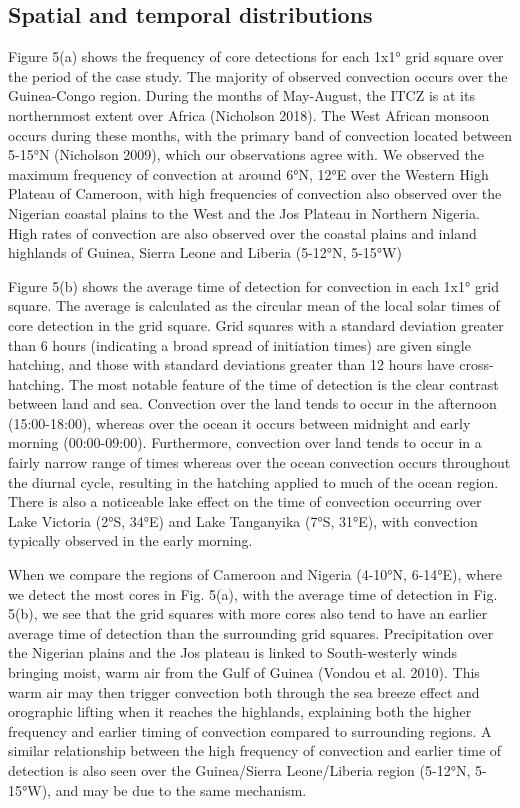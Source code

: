 \subsection{Spatial and temporal distributions}

Figure 5(a) shows the frequency of core detections for each 1x1° grid
square over the period of the case study. The majority of observed
convection occurs over the Guinea-Congo region. During the months of
May-August, the ITCZ is at its northernmost extent over Africa
(Nicholson 2018). The West African monsoon occurs during these
months, with the primary band of convection located between 5-15°N
(Nicholson 2009), which our observations agree with. We observed the
maximum frequency of convection at around 6°N, 12°E over the Western
High Plateau of Cameroon, with high frequencies of convection also
observed over the Nigerian coastal plains to the West and the Jos
Plateau in Northern Nigeria. High rates of convection are also observed
over the coastal plains and inland highlands of Guinea, Sierra Leone and
Liberia (5-12°N, 5-15°W)

Figure 5(b) shows the average time of detection for convection in each
1x1° grid square. The average is calculated as the circular mean of the
local solar times of core detection in the grid square. Grid squares
with a standard deviation greater than 6 hours (indicating a broad
spread of initiation times) are given single hatching, and those with
standard deviations greater than 12 hours have cross-hatching. The most
notable feature of the time of detection is the clear contrast between
land and sea. Convection over the land tends to occur in the afternoon
(15:00-18:00), whereas over the ocean it occurs between midnight and
early morning (00:00-09:00). Furthermore, convection over land tends to
occur in a fairly narrow range of times whereas over the ocean
convection occurs throughout the diurnal cycle, resulting in the
hatching applied to much of the ocean region. There is also a noticeable
lake effect on the time of convection occurring over Lake Victoria (2°S,
34°E) and Lake Tanganyika (7°S, 31°E), with convection typically
observed in the early morning.

When we compare the regions of Cameroon and Nigeria (4-10°N, 6-14°E),
where we detect the most cores in Fig. 5(a), with the average time of
detection in Fig. 5(b), we see that the grid squares with more cores
also tend to have an earlier average time of detection than the
surrounding grid squares. Precipitation over the Nigerian plains and the
Jos plateau is linked to South-westerly winds bringing moist, warm air
from the Gulf of Guinea (Vondou et al. 2010). This warm air may then
trigger convection both through the sea breeze effect and orographic
lifting when it reaches the highlands, explaining both the higher
frequency and earlier timing of convection compared to surrounding
regions. A similar relationship between the high frequency of convection
and earlier time of detection is also seen over the Guinea/Sierra
Leone/Liberia region (5-12°N, 5-15°W), and may be due to the same
mechanism.

